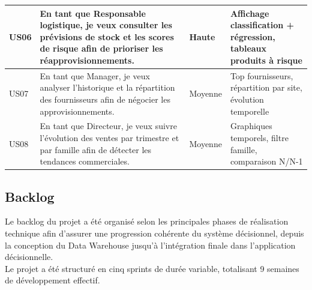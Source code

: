 {\begin{longtable}{|p{1.8cm}|p{6cm}|p{1.8cm}|p{7cm}|}
US06 & En tant que Responsable logistique, je veux consulter les prévisions de stock et les scores de risque afin de prioriser les réapprovisionnements. & Haute & Affichage classification + régression, tableaux produits à risque \\
\hline

US07 & En tant que Manager, je veux analyser l'historique et la répartition des fournisseurs afin de négocier les approvisionnements. & Moyenne & Top fournisseurs, répartition par site, évolution temporelle \\
\hline

US08 & En tant que Directeur, je veux suivre l'évolution des ventes par trimestre et par famille afin de détecter les tendances commerciales. & Moyenne & Graphiques temporels, filtre famille, comparaison N/N-1 \\
\hline

\end{longtable}

}

\subsection{Backlog}
Le backlog du projet a été organisé selon les principales phases de réalisation technique afin d’assurer une progression cohérente du système décisionnel, depuis la conception du Data Warehouse jusqu’à l’intégration finale dans l’application décisionnelle.\\
Le projet a été structuré en cinq sprints de durée variable, totalisant 9 semaines de développement effectif.


